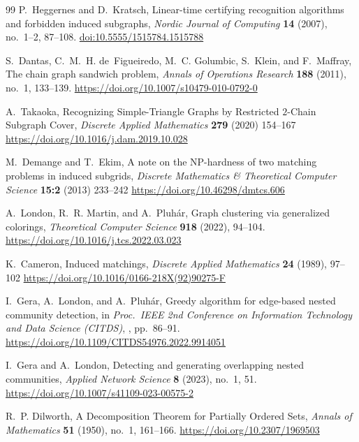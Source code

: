 \documentclass[12pt]{amsart}
\begin{document}
\begin{thebibliography}{99}
P.~Heggernes and D.~Kratsch,
\newblock Linear-time certifying recognition algorithms and forbidden induced subgraphs,
\newblock \emph{Nordic Journal of Computing} \textbf{14} (2007), no.~1--2, 87--108.
\newblock \href{https://doi.org/10.5555/1515784.1515788}{doi:10.5555/1515784.1515788}

S.~Dantas, C.~M.~H. de~Figueiredo, M.~C. Golumbic, S.~Klein, and F.~Maffray,
\newblock The chain graph sandwich problem,
\newblock \emph{Annals of Operations Research} \textbf{188} (2011), no.~1, 133--139.
\newblock \href{https://doi.org/10.1007/s10479-010-0792-0}{https://doi.org/10.1007/s10479-010-0792-0}


A.~Takaoka,
\newblock Recognizing Simple-Triangle Graphs by Restricted $2$-Chain Subgraph Cover,
\newblock \emph{Discrete Applied Mathematics} \textbf{279} (2020) 154--167
\newblock \href{https://doi.org/10.1016/j.dam.2019.10.028}{https://doi.org/10.1016/j.dam.2019.10.028}

M.~Demange and T.~Ekim,
\newblock A note on the NP-hardness of two matching problems in induced subgrids,
\newblock \emph{Discrete Mathematics \& Theoretical Computer Science} \textbf{15:2} (2013) 233--242
\newblock \href{https://doi.org/10.46298/dmtcs.606}{https://doi.org/10.46298/dmtcs.606}


A.~London, R.~R. Martin, and A.~Pluh{\'a}r,
\newblock Graph clustering via generalized colorings,
\newblock \emph{Theoretical Computer Science} \textbf{918} (2022), 94--104.
\newblock \href{https://doi.org/10.1016/j.tcs.2022.03.023}{https://doi.org/10.1016/j.tcs.2022.03.023}

K.~Cameron,
\newblock Induced matchings,
\newblock \emph{Discrete Applied Mathematics} \textbf{24} (1989), 97--102
\newblock \href{https://doi.org/10.1016/0166-218X(92)90275-F}{https://doi.org/10.1016/0166-218X(92)90275-F}

I.~Gera, A.~London, and A.~Pluh\'ar,
\newblock Greedy algorithm for edge-based nested community detection,
\newblock in \emph{Proc.\ IEEE 2nd Conference on Information Technology and Data Science (CITDS)},
, pp.~86--91.
\newblock \href{https://doi.org/10.1109/CITDS54976.2022.9914051}{https://doi.org/10.1109/CITDS54976.2022.9914051}

I.~Gera and A.~London,
\newblock Detecting and generating overlapping nested communities,
\newblock \emph{Applied Network Science} \textbf{8} (2023), no.~1, 51.
\newblock \href{https://doi.org/10.1007/s41109-023-00575-2}{https://doi.org/10.1007/s41109-023-00575-2}

R.~P. Dilworth,
\newblock A Decomposition Theorem for Partially Ordered Sets,
\newblock \emph{Annals of Mathematics} \textbf{51} (1950), no.~1, 161--166.
\newblock \href{https://doi.org/10.2307/1969503}{https://doi.org/10.2307/1969503}

\end{thebibliography}
\end{document}
